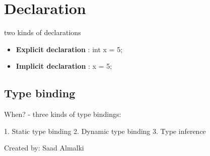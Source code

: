 \documentclass[12pt]{article}
\begin{document}
\section{Declaration}
two kinds of declarations

\begin{itemize}
    \item \textbf{Explicit declaration} : int x = 5;
    \item \textbf{Implicit declaration} : x = 5;
\end{itemize}

\subsection{Type binding}
When? - three kinds of type bindings:

1. Static type binding 2. Dynamic type binding 3. Type inference



\begin{flushright}
Created by: Saad Almalki \\
\end{flushright}
\end{document}
